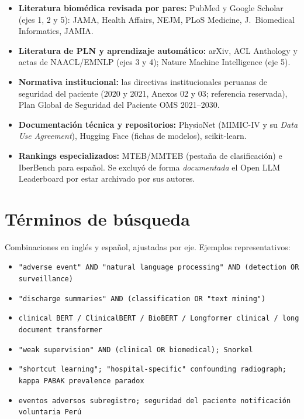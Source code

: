 \documentclass[11pt,a4paper]{article}
\begin{document}
\begin{itemize}[leftmargin=1.4em, itemsep=2pt]
  \item \textbf{Literatura biomédica revisada por pares:} PubMed y Google
  Scholar (ejes 1, 2 y 5): JAMA, Health Affairs, NEJM, PLoS Medicine,
  J.~Biomedical Informatics, JAMIA.
  \item \textbf{Literatura de PLN y aprendizaje automático:} arXiv, ACL
  Anthology y actas de NAACL/EMNLP (ejes 3 y 4); Nature Machine
  Intelligence (eje 5).
  \item \textbf{Normativa institucional:} las directivas institucionales peruanas de seguridad del
  paciente (2020 y 2021, Anexos 02 y 03; referencia reservada), Plan Global de Seguridad del
  Paciente OMS 2021--2030.
  \item \textbf{Documentación técnica y repositorios:} PhysioNet (MIMIC-IV y
  su \emph{Data Use Agreement}), Hugging Face (fichas de modelos),
  scikit-learn.
  \item \textbf{Rankings especializados:} MTEB/MMTEB (pestaña de
  clasificación) e IberBench para español. Se excluyó de forma
  \emph{documentada} el Open LLM Leaderboard por estar archivado por sus
  autores.
\end{itemize}

\section{Términos de búsqueda}

Combinaciones en inglés y español, ajustadas por eje. Ejemplos
representativos:

\begin{itemize}[leftmargin=1.4em, itemsep=1pt]
  \item \texttt{"adverse event" AND "natural language processing" AND
  (detection OR surveillance)}
  \item \texttt{"discharge summaries" AND (classification OR "text mining")}
  \item \texttt{clinical BERT / ClinicalBERT / BioBERT / Longformer clinical
  / long document transformer}
  \item \texttt{"weak supervision" AND (clinical OR biomedical); Snorkel}
  \item \texttt{"shortcut learning"; "hospital-specific" confounding
  radiograph; kappa PABAK prevalence paradox}
  \item \texttt{eventos adversos subregistro; seguridad del paciente
  notificación voluntaria Perú}
\end{itemize}
\end{document}
